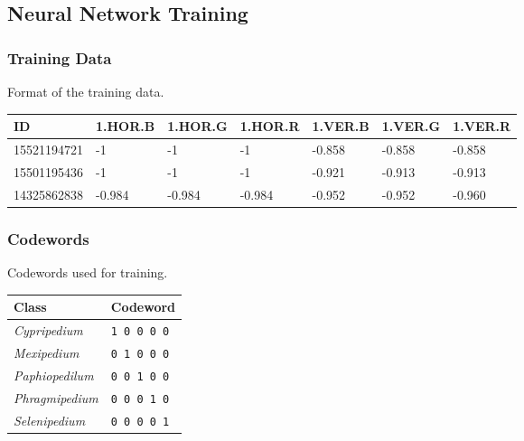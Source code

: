 \documentclass[]{beamer}
\begin{document}
    \subsection{Neural Network Training}

    \begin{frame}
        \frametitle{Training Data}

        Format of the training data.

        \begin{table}[h]\scriptsize
            \begin{center}
            \begin{tabular}{lllllll}
            \toprule
            ID & 1.HOR.B & 1.HOR.G & 1.HOR.R & 1.VER.B & 1.VER.G & 1.VER.R \\
            \midrule
            15521194721 & -1 & -1 & -1 & -0.858 & -0.858 & -0.858 \\
            15501195436 & -1 & -1 & -1 & -0.921 & -0.913 & -0.913 \\
            14325862838 & -0.984 & -0.984 & -0.984 & -0.952 & -0.952 & -0.960 \\
            \bottomrule
            \end{tabular}
            \end{center}
        \end{table}
    \end{frame}

    \begin{frame}
        \frametitle{Codewords}

        Codewords used for training.

        \begin{table}[h]\scriptsize
            \begin{center}
            \begin{tabular}{ll}
            \toprule
            \textbf{Class} & \textbf{Codeword} \\
            \midrule
            \textit{Cypripedium}    & \texttt{1 0 0 0 0} \\
            \textit{Mexipedium}     & \texttt{0 1 0 0 0} \\
            \textit{Paphiopedilum}  & \texttt{0 0 1 0 0} \\
            \textit{Phragmipedium}  & \texttt{0 0 0 1 0} \\
            \textit{Selenipedium}   & \texttt{0 0 0 0 1} \\
            \bottomrule
            \end{tabular}
            \end{center}
        \end{table}
    \end{frame}
\end{document}
